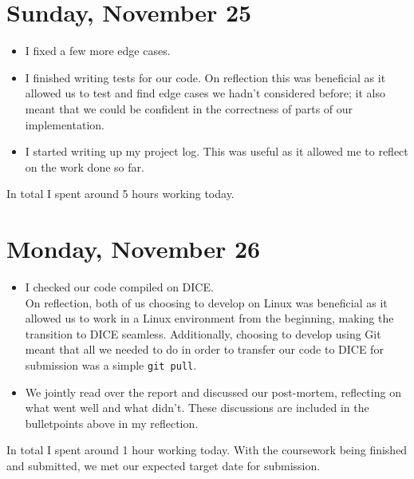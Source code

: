 \documentclass[titlepage, 12pt]{extarticle}
\begin{document}
\section{Sunday, November 25}
\begin{itemize}
  \item I fixed a few more edge cases.
  \item I finished writing tests for our code. On reflection this was beneficial as it allowed us to test and find edge cases we hadn't considered before; it also meant that we could be confident in the correctness of parts of our implementation.
  \item I started writing up my project log. This was useful as it allowed me to reflect on the work done so far. 
\end{itemize}
In total I spent around 5 hours working today.

\section{Monday, November 26}
\begin{itemize}
\item I checked our code compiled on DICE. \\ On reflection, both of us choosing to develop on Linux was beneficial as it allowed us to work in a Linux environment from the beginning, making the transition to DICE seamless. Additionally, choosing to develop using Git meant that all we needed to do in order to transfer our code to DICE for submission was a simple {\tt git pull}.
\item We jointly read over the report and discussed our post-mortem, reflecting on what went well and what didn't. These discussions are included in the bulletpoints above in my reflection. 
\end{itemize}
In total I spent around 1 hour working today. With the coursework being finished and submitted, we met our expected target date for submission.
\end{document}
